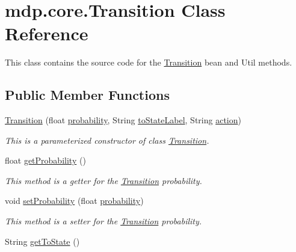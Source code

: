 \hypertarget{classmdp_1_1core_1_1_transition}{}\section{mdp.\+core.\+Transition Class Reference}
\label{classmdp_1_1core_1_1_transition}


This class contains the source code for the \hyperlink{classmdp_1_1core_1_1_transition}{Transition} bean and Util methods.  


\subsection*{Public Member Functions}
\begin{DoxyCompactItemize}
\item 
\hyperlink{classmdp_1_1core_1_1_transition_a8ea1491b234d802511facf17a529cbae}{Transition} (float \hyperlink{classmdp_1_1core_1_1_transition_a59ef462524ddda89b23c6974461a3ad5}{probability}, String \hyperlink{classmdp_1_1core_1_1_transition_ac820d803424e51b25a3a6c895b94a33a}{to\+State\+Label}, String \hyperlink{classmdp_1_1core_1_1_transition_ab7b1be5b4717075dfd6e40d62d2a25ca}{action})
\begin{DoxyCompactList}\small\item\em This is a parameterized constructor of class \hyperlink{classmdp_1_1core_1_1_transition}{Transition}. \end{DoxyCompactList}\item 
float \hyperlink{classmdp_1_1core_1_1_transition_a95efd6064033a3846334bc951e695613}{get\+Probability} ()
\begin{DoxyCompactList}\small\item\em This method is a getter for the \hyperlink{classmdp_1_1core_1_1_transition}{Transition} probability. \end{DoxyCompactList}\item 
void \hyperlink{classmdp_1_1core_1_1_transition_ab383baacd6f44a78b2e2ec2250557334}{set\+Probability} (float \hyperlink{classmdp_1_1core_1_1_transition_a59ef462524ddda89b23c6974461a3ad5}{probability})
\begin{DoxyCompactList}\small\item\em This method is a setter for the \hyperlink{classmdp_1_1core_1_1_transition}{Transition} probability. \end{DoxyCompactList}\item 
String \hyperlink{classmdp_1_1core_1_1_transition_ae7ef4a2d92e592e09f1987a90c84be1b}{get\+To\+State} ()

\end{DoxyCompactItemize}
